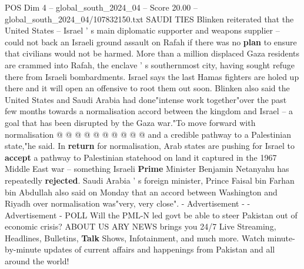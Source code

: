 \begin{textsample}{POS Dim 4 – global\_south\_2024\_04 – Score 20.00 – global\_south\_2024\_04/107832150.txt}
SAUDI TIES Blinken reiterated that the United States -- Israel ' s main diplomatic supporter and weapons supplier -- could not back an Israeli ground assault on Rafah if there was no \textbf{plan} to ensure that civilians would not be harmed.
More than a million displaced Gaza residents are crammed into Rafah, the enclave ' s southernmost city, having sought refuge there from Israeli bombardments.
Israel says the last Hamas fighters are holed up there and it will open an offensive to root them out soon.
Blinken also said the United States and Saudi Arabia had done"intense work together"over the past few months towards a normalisation accord between the kingdom and Israel -- a goal that has been disrupted by the Gaza war."To move forward with normalisation @ @ @ @ @ @ @ @ @ @ and a credible pathway to a Palestinian state,"he said.
In \textbf{return} for normalisation, Arab states are pushing for Israel to \textbf{accept} a pathway to Palestinian statehood on land it captured in the 1967 Middle East war -- something Israeli \textbf{Prime} Minister Benjamin Netanyahu has repeatedly \textbf{rejected}.
Saudi Arabia ' s foreign minister, Prince Faisal bin Farhan bin Abdullah also said on Monday that an accord between Washington and Riyadh over normalisation was"very, very close". - Advertisement - - Advertisement - POLL Will the PML-N led govt be able to steer Pakistan out of economic crisis?
ABOUT US ARY NEWS brings you 24/7 Live Streaming, Headlines, Bulletins, \textbf{Talk} Shows, Infotainment, and much more.
Watch minute-by-minute updates of current affairs and happenings from Pakistan and all around the world!

\end{textsample}
